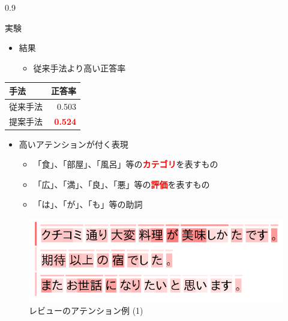 \documentclass[unicode,10pt]{beamer}
\newlength{\mycolumnwidth}
\newcommand{\itemtitle}[1]{#1\\}
\newcommand{\fire}[1]{\textcolor{red}{\textbf{#1}}}
\begin{document}
\begin{frame}[t]
\begin{columns}[onlytextwidth,t]
\begin{column}{0.9\mycolumnwidth}
\begin{block}{実験}
      \begin{minipage}[t]{0.55\linewidth}
        \begin{itemize}
          \item \itemtitle{結果}
            \begin{itemize}
              \item 従来手法より高い正答率
            \end{itemize}
        \end{itemize}
      \end{minipage}%
      \begin{minipage}[t]{0.4\linewidth}
        \begin{table}
          \centering
          \begin{tabular}{l | r}
            手法 & 正答率 \\
            \hline
            従来手法\cite{me16} & 0.503        \\
            提案手法            & \fire{0.524} \\
          \end{tabular}
        \end{table}
      \end{minipage}

      \begin{itemize}
        \item 高いアテンションが付く表現
          \begin{itemize}
            \item 「食」、「部屋」、「風呂」等の\fire{カテゴリ}を表すもの
            \item 「広」、「満」、「良」、「悪」等の\fire{評価}を表すもの
            \item 「は」、「が」、「も」等の助詞
          \end{itemize}
      \end{itemize}

      \begin{figure}
        \centering
        \includegraphics[width=0.9\linewidth]{fig/review_1.png}
        \caption*{レビューのアテンション例 (1)}
      \end{figure}


\end{block}
\end{column}
\end{columns}
\end{frame}
\end{document}
